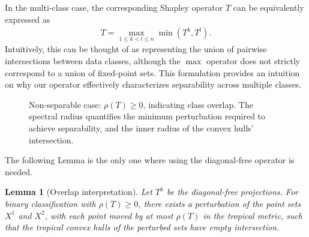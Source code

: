\documentclass{article}
\newtheorem{lemma}[theorem]{Lemma}
\renewcommand{\geq}{\geqslant}
\renewcommand{\leq}{\leqslant}
\begin{document}
In the multi-class case, the corresponding Shapley operator $T$ can be equivalently expressed as
\begin{align}
T = \max_{1 \leq k < l \leq n}\min(T^k, T^l).
\end{align}
Intuitively, this can be thought of as representing the union of pairwise intersections between data classes, although the $\max$ operator does not strictly correspond to a union of fixed-point sets. This formulation provides an intuition on why our operator effectively characterizes separability across multiple classes.

\begin{figure}[htbp]
    \centering
    \resizebox{0.5\textwidth}{!}{\clipbox{0.15\width{} 0.15\height{} 0.15\width{} 0.15\height{}}{}}
    \caption{Non-separable case: $\rho(T) \geq 0$, indicating class overlap. The spectral radius quantifies the minimum perturbation required to achieve separability, and the inner radius of the convex hulls' intersection.}
    \label{fig:non_separable}
\end{figure}

The following Lemma is the only one where using the diagonal-free operator is needed.

\begin{lemma}[Overlap interpretation]\label{lemma:perturbation}
Let $T^k$ be the diagonal-free projections. For binary classification with $\rho(T) \geq 0$, there exists a perturbation of the point sets $X^1$ and $X^2$, with each point moved by at most $\rho(T)$ in the tropical metric, such that the tropical convex hulls of the perturbed sets have empty intersection.
\end{lemma}
\end{document}
